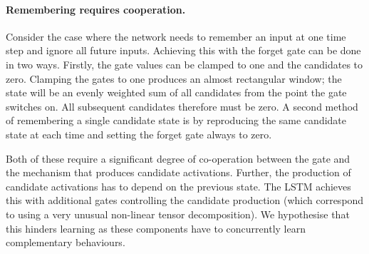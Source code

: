 \paragraph{Remembering requires cooperation.}
Consider the case where the network needs to remember an input at one time step and ignore all future
inputs. Achieving this with the forget gate can be done in two
ways. Firstly, the gate values can be clamped to one and the
candidates to zero. Clamping the gates to one produces an almost rectangular window; the state will be an
evenly weighted sum of all candidates from the point the gate switches on. All subsequent candidates
therefore must be zero.
A second method of remembering a single candidate state is by reproducing the same candidate
state at each time and setting the forget gate always to zero.

Both of these require a significant degree of co-operation between the gate and the mechanism that
produces candidate activations. Further, the production of candidate activations has to
depend on the previous state. The LSTM achieves this with additional gates controlling the candidate
production (which correspond to using a very unusual non-linear tensor decomposition). 
We hypothesise that this hinders learning as these components have to concurrently learn
complementary behaviours.

%

